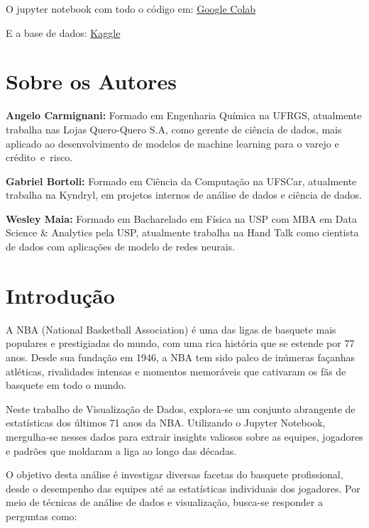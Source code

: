 \documentclass[
]{book}
\begin{document}
O jupyter notebook com todo o código em: \href{https://colab.research.google.com/drive/17QtBrAnpQrDZbt0wV8LfIBlS4_7Be5qC?usp=sharing}{Google Colab}

E a base de dados: \href{https://www.kaggle.com/datasets/ricardotorresheredia/nba-stats-from-the-last-71-years}{Kaggle}

\hypertarget{author}{%
\chapter*{Sobre os Autores}\label{author}}

\textbf{Angelo Carmignani:} Formado em Engenharia Química na UFRGS, atualmente trabalha nas Lojas Quero-Quero S.A, como gerente de ciência de dados, mais aplicado ao desenvolvimento de modelos de machine learning para o varejo e crédito~e~risco.

\textbf{Gabriel Bortoli:} Formado em Ciência da Computação na UFSCar, atualmente trabalha na Kyndryl, em projetos internos de análise de dados e ciência de dados.

\textbf{Wesley Maia:} Formado em Bacharelado em Física na USP com MBA em Data Science \& Analytics pela USP, atualmente trabalha na Hand Talk como cientista de dados com aplicações de modelo de redes neurais.

\hypertarget{introduuxe7uxe3o}{%
\chapter{Introdução}\label{introduuxe7uxe3o}}

A NBA (National Basketball Association) é uma das ligas de basquete mais populares e prestigiadas do mundo, com uma rica história que se estende por 77 anos. Desde sua fundação em 1946, a NBA tem sido palco de inúmeras façanhas atléticas, rivalidades intensas e momentos memoráveis que cativaram os fãs de basquete em todo o mundo.

Neste trabalho de Visualização de Dados, explora-se um conjunto abrangente de estatísticas dos últimos 71 anos da NBA. Utilizando o Jupyter Notebook, mergulha-se nesses dados para extrair insights valiosos sobre as equipes, jogadores e padrões que moldaram a liga ao longo das décadas.

O objetivo desta análise é investigar diversas facetas do basquete profissional, desde o desempenho das equipes até as estatísticas individuais dos jogadores. Por meio de técnicas de análise de dados e visualização, busca-se responder a perguntas como:
\end{document}
